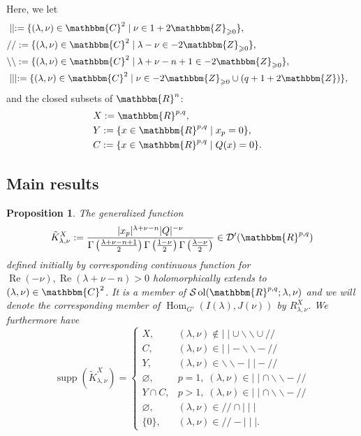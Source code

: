 \documentclass{article}
\newcommand{\assign}{:=}
\newcommand{\nin}{\not\in}
\newcommand{\tmop}[1]{\ensuremath{\operatorname{#1}}}
\newtheorem{proposition}{Proposition}[section]
\theoremstyle{remark}
\begin{document}
Here, we let
\begin{eqnarray}
  & \mid \mid \assign \{ (\lambda, \nu) \in \mathbbm{C}^2 \mid \nu \in 1 +
  2\mathbbm{Z}_{\geqslant 0} \}, &  \nonumber\\
  & / / \assign \{ (\lambda, \nu) \in \mathbbm{C}^2 \mid \lambda - \nu \in -
  2\mathbbm{Z}_{\geqslant 0} \}, &  \nonumber\\
  & \backslash\backslash \assign \{ (\lambda, \nu) \in \mathbbm{C}^2 \mid
  \lambda + \nu - n + 1 \in - 2\mathbbm{Z}_{\geqslant 0} \}, &  \nonumber\\
  & \mid \mid \mid \assign \{ (\lambda, \nu) \in \mathbbm{C}^2 \mid \nu \in -
  2\mathbbm{Z}_{\geqslant 0} \cup (q + 1 + 2\mathbbm{Z}) \}, &  \nonumber
\end{eqnarray}
and the closed subsets of $\mathbbm{R}^n$:
\begin{eqnarray}
  & X \assign \mathbbm{R}^{p, q}, &  \nonumber\\
  & Y \assign \{ x \in \mathbbm{R}^{p, q} \mid x_p = 0 \}, &  \nonumber\\
  & C \assign \{ x \in \mathbbm{R}^{p, q} \mid Q (x) = 0 \} . &  \nonumber
\end{eqnarray}

\subsection{Main results}

\begin{proposition}
  \label{supp-R:prop-main}The generalized function
  \[ \tilde{K}_{\lambda, \nu}^X \assign \frac{| x_p |^{\lambda + \nu - n} | Q
     |^{- \nu}}{\Gamma \left( \frac{\lambda + \nu - n + 1}{2} \right) \Gamma
     \left( \frac{1 - \nu}{2} \right) \Gamma \left( \frac{\lambda - \nu}{2}
     \right)} \in \mathcal{D}' (\mathbbm{R}^{p, q}) \]
  defined initially by corresponding continuous function for $\tmop{Re} (-
  \nu), \tmop{Re} (\lambda + \nu - n) > 0$ holomorphically extends to
  $(\lambda, \nu) \in \mathbbm{C}^2$. It is a member of $\mathcal{S} \tmop{ol}
  (\mathbbm{R}^{p, q} ; \lambda, \nu)$ and we will denote the corresponding
  member of $\tmop{Hom}_{G'} (I (\lambda), J (\nu))$ by $R_{\lambda, \nu}^X$.
  We furthermore have
  \[ \tmop{supp} (\tilde{K}_{\lambda, \nu}^X) = \left\{ \begin{array}{ll}
       X, & (\lambda, \nu) \nin \mid \mid \cup \backslash\backslash \cup / /\\
       C, & (\lambda, \nu) \in \mid \mid -\backslash\backslash - / /\\
       Y, & (\lambda, \nu) \in \backslash\backslash - \mid \mid - / /\\
       \varnothing, & p = 1, \; (\lambda, \nu) \in \mid \mid \cap
       \backslash\backslash - / /\\
       Y \cap C, & p > 1, \; (\lambda, \nu) \in \mid \mid \cap
       \backslash\backslash - / /\\
       \varnothing, & (\lambda, \nu) \in / / \cap \mid \mid \mid\\
       \{ 0 \}, & (\lambda, \nu) \in / / - \mid \mid \mid .
     \end{array} \right. \]
\end{proposition}
\end{document}
